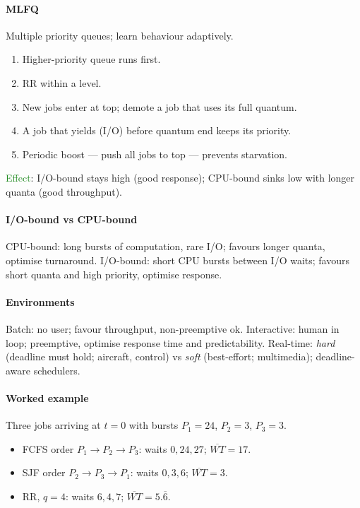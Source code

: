 \paragraph{MLFQ} Multiple priority queues; learn behaviour adaptively.
\begin{enumerate}
  \item Higher-priority queue runs first.
  \item RR within a level.
  \item New jobs enter at top; \textcolor{Bittersweet}{demote} a job that uses its full quantum.
  \item A job that yields (I/O) before quantum end keeps its priority.
  \item Periodic \textcolor{Bittersweet}{boost} — push all jobs to top — prevents starvation.
\end{enumerate}
\textcolor{ForestGreen}{Effect}: I/O-bound stays high (good response); CPU-bound sinks low with longer quanta (good throughput).

\paragraph{I/O-bound vs CPU-bound}
\textcolor{Bittersweet}{CPU-bound}: long bursts of computation, rare I/O; favours longer quanta, optimise turnaround.
\textcolor{Bittersweet}{I/O-bound}: short CPU bursts between I/O waits; favours short quanta and high priority, optimise response.

\paragraph{Environments}
\textcolor{Bittersweet}{Batch}: no user; favour throughput, non-preemptive ok.
\textcolor{Bittersweet}{Interactive}: human in loop; preemptive, optimise response time and predictability.
\textcolor{Bittersweet}{Real-time}: \emph{hard} (deadline must hold; aircraft, control) vs \emph{soft} (best-effort; multimedia); deadline-aware schedulers.

\paragraph{Worked example} Three jobs arriving at $t=0$ with bursts $P_1=24$, $P_2=3$, $P_3=3$.
\begin{itemize}
  \item \textcolor{Bittersweet}{FCFS} order $P_1\!\to\!P_2\!\to\!P_3$: waits $0,24,27$; $\overline{WT}=17$.
  \item \textcolor{Bittersweet}{SJF} order $P_2\!\to\!P_3\!\to\!P_1$: waits $0,3,6$; $\overline{WT}=3$.
  \item \textcolor{Bittersweet}{RR}, $q=4$: waits $6,4,7$; $\overline{WT}=5.\overline{6}$.
\end{itemize}

